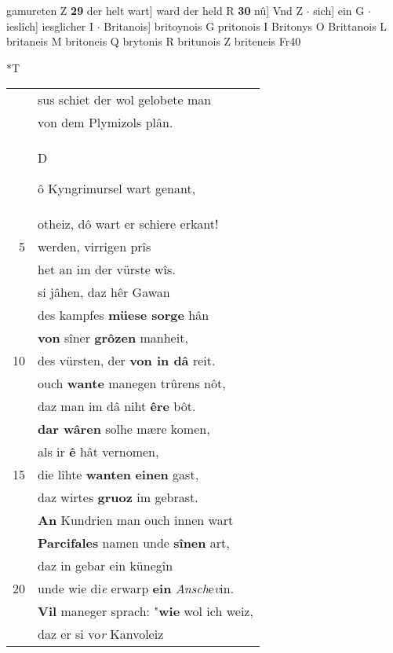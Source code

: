 \documentclass[8pt,a4paper,notitlepage]{article}
\begin{document}
\begin{table}[ht]
\begin{minipage}[t]{0.5\linewidth}
gamureten Z \textbf{29} der helt wart] ward der held R \textbf{30} nû] Vnd Z  $\cdot$ sich] ein G  $\cdot$ ieslîch] iesglicher I  $\cdot$ Britanois] britoynois G pritonois I Britonys O Brittanois L britaneis M britoneis Q brytonis R britunois Z briteneis Fr40 \newline
\end{minipage}
\hspace{0.5cm}
\begin{minipage}[t]{0.5\linewidth}
\small
\begin{center}*T
\end{center}
\begin{tabular}{rl}
 & sus schiet der wol gelobete man\\ 
 & von dem Plymizols plân.\\ 
 & \begin{large}D\end{large}ô Kyngrimursel wart genant,\\ 
 & otheiz, dô wart er schiere erkant!\\ 
5 & werden, virrigen prîs\\ 
 & het an im der vürste wîs.\\ 
 & si jâhen, daz hêr Gawan\\ 
 & des kampfes \textbf{müese sorge} hân\\ 
 & \textbf{von} sîner \textbf{grôzen} manheit,\\ 
10 & des vürsten, der \textbf{von in dâ} reit.\\ 
 & ouch \textbf{wante} manegen trûrens nôt,\\ 
 & daz man im dâ niht \textbf{êre} bôt.\\ 
 & \textbf{dar wâren} solhe mære komen,\\ 
 & als ir \textbf{ê} hât vernomen,\\ 
15 & die lîhte \textbf{wanten} \textbf{einen} gast,\\ 
 & daz wirtes \textbf{gruoz} im gebrast.\\ 
 & \textbf{An} Kundrien man ouch innen wart\\ 
 & \textbf{Parcifales} namen unde \textbf{sînen} art,\\ 
 & daz in gebar ein künegîn\\ 
20 & unde wie di\textit{e} erwarp \textbf{ein} \textit{Ansch}e\textit{v}in.\\ 
 & \textbf{Vil} maneger sprach: "\textbf{wie} wol ich weiz,\\ 
 & daz er si vo\textit{r} Kanvoleiz\\ 

\end{tabular}
\end{minipage}
\end{table}
\end{document}
